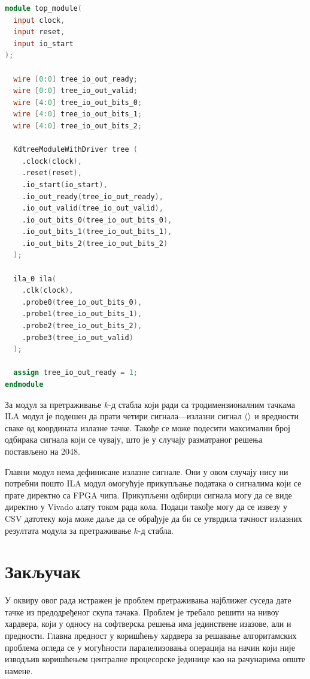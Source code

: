 \documentclass[master]{finthesis}
\newcommand*{\kd}{\texorpdfstring{$k$}{k}-д }
\newcommand*{\correctmath}[1]{%
    \ifcsname mathCorrectionFor#1\endcsname%
        \csname mathCorrectionFor#1\endcsname%
    \else%
        #1%
    \fi%
}
\newcommand*{\mfield}[1]{{\langle\correctmath{#1}\/\rangle}}
\newcommand*{\field}[1]{\texorpdfstring{$\mfield{#1}$}{⟨#1⟩}}
\newcommand*{\prog}[1]{\texttt{#1}}
\begin{document}
\begin{lstlisting}[language=Verilog, caption={Реализација главног модула који повезује Xilinx-ов ILA модул на излаз модула \prog{KdTreeModuleWithDriver}.}]
module top_module(
  input clock,
  input reset,
  input io_start
);

  wire [0:0] tree_io_out_ready;
  wire [0:0] tree_io_out_valid;
  wire [4:0] tree_io_out_bits_0;
  wire [4:0] tree_io_out_bits_1;
  wire [4:0] tree_io_out_bits_2;

  KdtreeModuleWithDriver tree (
    .clock(clock),
    .reset(reset),
    .io_start(io_start),
    .io_out_ready(tree_io_out_ready),
    .io_out_valid(tree_io_out_valid),
    .io_out_bits_0(tree_io_out_bits_0),
    .io_out_bits_1(tree_io_out_bits_1),
    .io_out_bits_2(tree_io_out_bits_2)
  );

  ila_0 ila(
    .clk(clock),
    .probe0(tree_io_out_bits_0),
    .probe1(tree_io_out_bits_1),
    .probe2(tree_io_out_bits_2),
    .probe3(tree_io_out_valid)
  );

  assign tree_io_out_ready = 1;
endmodule
\end{lstlisting}

За модул за претраживање \kd стабла који ради са тродимензионалним тачкама ILA модул је подешен да прати четири сигнала---излазни сигнал \field{valid} и вредности сваке од координата излазне тачке. Такође се може подесити максимални број одбирака сигнала који се чувају, што је у случају разматраног решења постављено на 2048.

Главни модул нема дефинисане излазне сигнале. Они у овом случају нису ни потребни пошто ILA модул омогућује прикупљање података о сигналима који се прате директно са FPGA чипа. Прикупљени одбирци сигнала могу да се виде директно у Vivado алату током рада кола. Подаци такође могу да се извезу у CSV датотеку која може даље да се обрађује да би се утврдила тачност излазних резултата модула за претраживање \kd стабла.

\section{Закључак}

У оквиру овог рада истражен је проблем претраживања најближег суседа дате тачке из предодређеног скупа тачака. Проблем је требало решити на нивоу хардвера, који у односу на софтверска решења има јединствене изазове, али и предности. Главна предност у коришћењу хардвера за решавање алгоритамских проблема огледа се у могућности паралелизовања операција на начин који није изводљив коришћењем централне процесорске јединице као на рачунарима опште намене.
\end{document}
